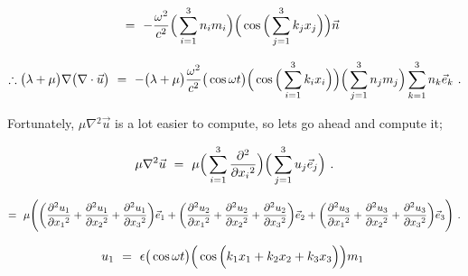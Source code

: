 \documentclass{article}
\begin{document}
\begin{equation} \label{eb-eq-1-157}
= \hspace{0.125cm} - \frac{\omega{}^2}{c^2} \Big( \sum_{i = 1}^{3} n_i m_i \Big) \Big( \cos \Big( \sum_{j = 1}^{3} k_j x_j \Big) \Big) \vec{n} \hspace{0.125cm} 
\end{equation}

\begin{equation} \label{eb-eq-1-158}
\therefore \big( \lambda + \mu \big) \nabla \big( \nabla \cdot \vec{u} \big) \hspace{0.125cm} = \hspace{0.125cm} -  \big( \lambda + \mu \big)    \frac{\omega{}^2}{c^2} \big( \cos{ \omega t } \big) \Big( \cos \Big( \sum_{i = 1}^{3} k_i x_i \Big) \Big) \Big( \sum_{j = 1}^{3} n_j m_j \Big) \sum_{k = 1}^{3} n_k \vec{e}_k \hspace{0.125cm}  .
\end{equation}

Fortunately, \begin{math} \mu \nabla{}^2 \vec{u} \end{math} is a lot easier to compute, so lets go ahead and compute it;

\begin{equation} \label{eb-eq-1-159}
\mu \nabla{}^2 \vec{u} \hspace{0.125cm} = \hspace{0.125cm} \mu \Big( \sum_{i = 1}^{3} \frac{\partial{}^2}{\partial{x_i}^2} \Big) \Big( \sum_{j = 1}^{3} u_j \vec{e}_j \Big) \hspace{0.125cm}  .
\end{equation}

\begin{equation} \label{eb-eq-1-160}
= \hspace{0.125cm} \mu \Bigg( \bigg( \frac{\partial{}^2 u_1}{\partial{x_1}^2} + \frac{\partial{}^2 u_1}{\partial{x_2}^2} + \frac{\partial{}^2 u_1}{\partial{x_3}^2} \bigg) \vec{e}_1 + \bigg( \frac{\partial{}^2 u_2}{\partial{x_1}^2} + \frac{\partial{}^2 u_2}{\partial{x_2}^2} + \frac{\partial{}^2 u_2}{\partial{x_3}^2} \bigg) \vec{e}_2 + \bigg( \frac{\partial{}^2 u_3}{\partial{x_1}^2} + \frac{\partial{}^2 u_3}{\partial{x_2}^2} + \frac{\partial{}^2 u_3}{\partial{x_3}^2} \bigg) \vec{e}_3 \Bigg) \hspace{0.125cm}  .
\end{equation}

\begin{equation} \label{eb-eq-1-161}
u_1 \hspace{0.125cm} = \hspace{0.125cm} \epsilon \big( \cos{ \omega t } \big) \Big( \cos \Big( k_1 x_1 + k_2 x_2 + k_3 x_3 \Big) \Big) m_1 \hspace{0.125cm} 
\end{equation}
\end{document}
